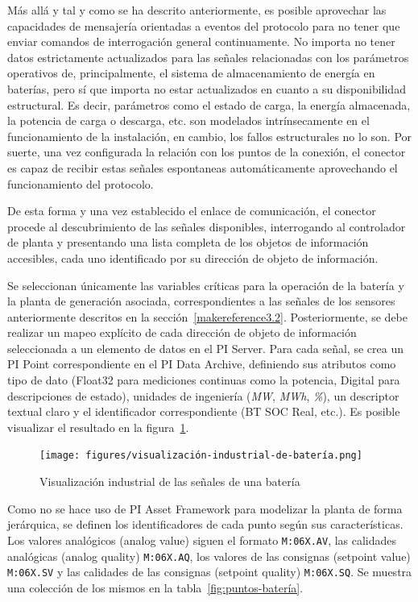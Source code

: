 Más allá y tal y como se ha descrito anteriormente, es posible aprovechar las capacidades de mensajería orientadas a eventos del protocolo para no tener que enviar comandos de interrogación general continuamente. No importa no tener datos estrictamente actualizados para las señales relacionadas con los parámetros operativos de, principalmente, el sistema de almacenamiento de energía en baterías, pero sí que importa no estar actualizados en cuanto a su disponibilidad estructural. Es decir, parámetros como el estado de carga, la energía almacenada, la potencia de carga o descarga, etc. son modelados intrínsecamente en el funcionamiento de la instalación, en cambio, los fallos estructurales no lo son. Por suerte, una vez configurada la relación con los puntos de la conexión, el conector es capaz de recibir estas señales espontaneas automáticamente aprovechando el funcionamiento del protocolo.

De esta forma y una vez establecido el enlace de comunicación, el conector procede al descubrimiento de las señales disponibles, interrogando al controlador de planta y presentando una lista completa de los objetos de información accesibles, cada uno identificado por su dirección de objeto de información.

Se seleccionan únicamente las variables críticas para la operación de la batería y la planta de generación asociada, correspondientes a las señales de los sensores anteriormente descritos en la sección~\ref{makereference3.2}. Posteriormente, se debe realizar un mapeo explícito de cada dirección de objeto de información seleccionada a un elemento de datos en el PI Server. Para cada señal, se crea un PI Point correspondiente en el PI Data Archive, definiendo sus atributos como tipo de dato (Float32 para mediciones continuas como la potencia, Digital para descripciones de estado), unidades de ingeniería (\textit{MW}, \textit{MWh}, \textit{\%}), un descriptor textual claro y el identificador correspondiente (BT SOC Real, etc.). Es posible visualizar el resultado en la figura~\ref{fig:visualización-industrial-de-batería}.

\begin{figure}
\centering
\texttt{[image: figures/visualización-industrial-de-batería.png]}
\caption{Visualización industrial de las señales de una batería}
\label{fig:visualización-industrial-de-batería}
\end{figure}

Como no se hace uso de PI Asset Framework para modelizar la planta de forma jerárquica, se definen los identificadores de cada punto según sus características. Los valores analógicos (analog value) siguen el formato \texttt{M:06X.AV}, las calidades analógicas (analog quality) \texttt{M:06X.AQ}, los valores de las consignas (setpoint value) \texttt{M:06X.SV} y las calidades de las consignas (setpoint quality) \texttt{M:06X.SQ}. Se muestra una colección de los mismos en la tabla~\ref{fig:puntos-batería}.

